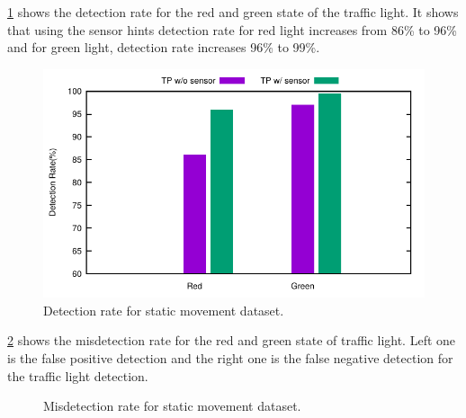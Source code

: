 \ref{f:tp_stat} shows the detection rate for the red and green state of the traffic light.
It shows that using the sensor hints detection rate for red light increases from 86\% to 96\% and for green light, detection rate increases 96\% to 99\%.

\begin{figure}[h!]
\centering
\includegraphics[width=5.2in]{plots/bar_tp.pdf}
\caption{Detection rate for static movement dataset.}
\label{f:tp_stat}
\end{figure}

\ref{f:fp_stat} shows the misdetection rate for the red and green state of traffic light.
Left one is the false positive detection and the right one is the false negative detection for the traffic light detection.

\begin{figure}[!ht]
\centering
{}
\hfill
{}
\caption{Misdetection rate for static movement dataset.}
\label{f:fp_stat}
\end{figure}

